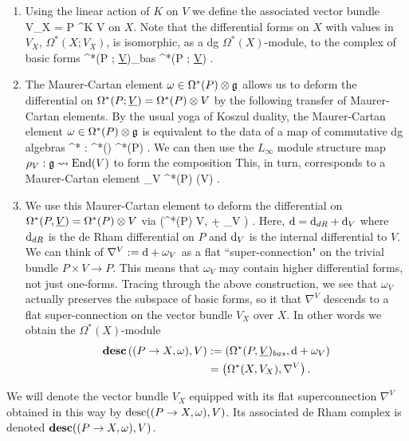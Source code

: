 \begin{enumerate}
\item Using the linear action of $K$ on $V$ we define the associated vector bundle
\ben
V_X = P \times^{K} V
\een 
on $X$. Note that the differential forms on $X$ with values in $V_X$, $\Omega^*(X ; V_X)$, is isomorphic, as a dg $\Omega^*(X)$-module, to the complex of basic forms
\ben
\Omega^*(P ; \ul{V})_{bas} \subset \Omega^*(P ; \ul{V}) .
\een 
\item The Maurer-Cartan element $\omega \in \Omega^*(P) \otimes \mathfrak g$ allows us to deform the differential on $\Omega^{*}(P ; \underline{V}) = \Omega^*(P) \otimes V$ by the following transfer of Maurer-Cartan elements. 
By the usual yoga of Koszul duality, the Maurer-Cartan element $\omega \in \Omega^*(P) \otimes \mathfrak g$ is equivalent to the data of a map of commutative dg algebras
\ben
\omega^* : \clie^*(\fg) \to \Omega^*(P) .
\een 
We can then use the $L_\infty$ module structure map $\rho_V : \mathfrak g \rightsquigarrow {\rm End}(V)$ to  form the composition
\ben
{}
\een
This, in turn, corresponds to a Maurer-Cartan element 
\ben
\omega_V \in \Omega^*(P) \tensor \End(V) .
\een 

\item We use this Maurer-Cartan element to deform the differential on $\Omega^*(P , \underline{V}) = \Omega^*(P) \otimes V$ via
\ben
\left(\Omega^*(P) \tensor V, \d + \omega_V \right) .
\een
Here, ${\rm d} = {\rm d}_{dR} + {\rm d}_V$ where ${\rm d}_{dR}$ is the de Rham differential on $P$ and ${\rm d}_V$ is the internal differential to $V$. 
We can think of $\nabla^V := {\rm d} + \omega_V$ as a flat ``super-connection" on the trivial bundle $P \times V \to P$. 
This means that $\omega_V$ may contain higher differential forms, not just one-forms. 
Tracing through the above construction, we see that $\omega_V$ actually preserves the subspace of basic forms, so it that $\nabla^V$ descends to a flat super-connection on the vector bundle $V_X$ over $X$. 
In other words we obtain the $\Omega^*(X)$-module
\begin{align*}
\mathbf{desc} \left((P \to X, \omega), V\right) & :=  \left(\Omega^*(P , \underline{V})_{bas} , {\rm d} + \omega_V\right) \\ & = \left(\Omega^*(X , V_X), \nabla^V\right) . 
\end{align*}

\end{enumerate}

\begin{dfn} 
\label{dfn: htpy descent}
We will denote the vector bundle $V_X$ equipped with its flat superconnection $\nabla^V$ obtained in this way by ${\rm desc}((P\to X, \omega), V)$. 
Its associated de Rham complex is denoted $\mathbf{desc}((P \to X, \omega), V)$. 
\end{dfn}
 
